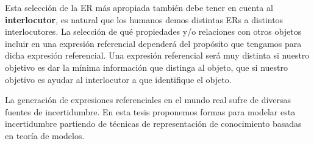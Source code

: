 %

Esta selecci\'on de la ER m\'as apropiada tambi\'en debe tener en cuenta al \textbf {interlocutor}, es natural que los humanos demos distintas ERs a distintos interlocutores.
La selecci\'on de qu\'e propiedades y/o relaciones con otros objetos incluir en una expresi\'on referencial depender\'a del prop\'osito que tengamos para dicha expresi\'on referencial. Una expresi\'on referencial ser\'a muy distinta si nuestro objetivo es dar la m\'inima informaci\'on que distinga al objeto, que si nuestro objetivo es ayudar al interlocutor a que identifique el objeto.

La generaci\'on de expresiones referenciales en el mundo real sufre de diversas fuentes de incertidumbre. En esta tesis proponemos formas para modelar esta incertidumbre partiendo de t\'ecnicas de representaci\'on de conocimiento basadas en teor\'ia de modelos.
%

